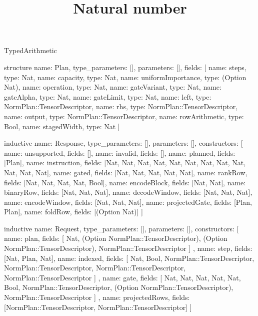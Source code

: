 \begin{lexlean}{TypedArithmetic}
\title{Natural number}
\begin{semanticmodule}
structure{
  name: Plan,
  type_parameters: [],
  parameters: [],
  fields: [
    {name: steps, type: Nat},
    {name: capacity, type: Nat},
    {name: uniformImportance, type: (Option Nat)},
    {name: operation, type: Nat},
    {name: gateVariant, type: Nat},
    {name: gateAlpha, type: Nat},
    {name: gateLimit, type: Nat},
    {name: left, type: NormPlan::TensorDescriptor},
    {name: rhs, type: NormPlan::TensorDescriptor},
    {name: output, type: NormPlan::TensorDescriptor},
    {name: rowArithmetic, type: Bool},
    {name: stagedWidth, type: Nat}
  ]
}

inductive{
  name: Response,
  type_parameters: [],
  parameters: [],
  constructors: [
    {name: unsupported, fields: []},
    {name: invalid, fields: []},
    {name: planned, fields: [Plan]},
    {name: instruction, fields: [Nat, Nat, Nat, Nat, Nat, Nat, Nat, Nat, Nat, Nat, Nat, Nat]},
    {name: gated, fields: [Nat, Nat, Nat, Nat, Nat]},
    {name: rankRow, fields: [Nat, Nat, Nat, Nat, Bool]},
    {name: encodeBlock, fields: [Nat, Nat]},
    {name: binaryRow, fields: [Nat, Nat, Nat]},
    {name: decodeWindow, fields: [Nat, Nat, Nat]},
    {name: encodeWindow, fields: [Nat, Nat, Nat]},
    {name: projectedGate, fields: [Plan, Plan]},
    {name: foldRow, fields: [(Option Nat)]}
  ]
}

inductive{
  name: Request,
  type_parameters: [],
  parameters: [],
  constructors: [
    {
      name: plan,
      fields: [
        Nat,
        (Option NormPlan::TensorDescriptor),
        (Option NormPlan::TensorDescriptor),
        NormPlan::TensorDescriptor
      ]
    },
    {name: step, fields: [Nat, Plan, Nat]},
    {
      name: indexed,
      fields: [
        Nat,
        Bool,
        NormPlan::TensorDescriptor,
        NormPlan::TensorDescriptor,
        NormPlan::TensorDescriptor,
        NormPlan::TensorDescriptor
      ]
    },
    {
      name: gate,
      fields: [
        Nat,
        Nat,
        Nat,
        Nat,
        Nat,
        Bool,
        NormPlan::TensorDescriptor,
        (Option NormPlan::TensorDescriptor),
        NormPlan::TensorDescriptor
      ]
    },
    {name: projectedRows, fields: [NormPlan::TensorDescriptor, NormPlan::TensorDescriptor]}
  ]
}


\end{semanticmodule}
\end{lexlean}
